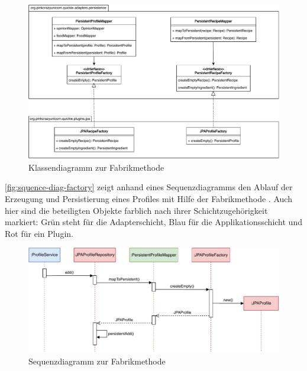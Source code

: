 \begin{figure}[ht!]
    \includegraphics[width=0.98\columnwidth]{../diagrams/factory_uml.pdf}
    \caption{Klassendiagramm zur Fabrikmethode}
    \label{fig:class-diag-factory}
\end{figure}

\autoref{fig:squence-diag-factory} zeigt anhand eines Sequenzdiagramms den Ablauf der Erzeugung und Persistierung eines Profiles mit Hilfe der Fabrikmethode . Auch hier sind die beteiligten Objekte farblich nach ihrer Schichtzugehörigkeit markiert: Grün steht für die Adapterschicht, Blau für die Applikationsschicht und Rot für ein Plugin.

\begin{figure}[ht!]
    \includegraphics[width=0.98\columnwidth]{../diagrams/factory_sequence.pdf}
    \caption{Sequenzdiagramm zur Fabrikmethode}
    \label{fig:squence-diag-factory}
\end{figure}
